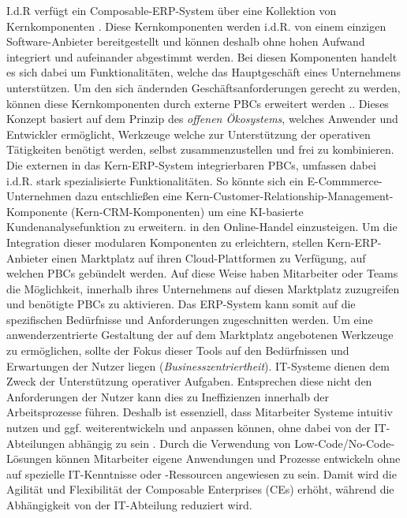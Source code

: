 I.d.R verfügt ein Composable-ERP-System über eine Kollektion von Kernkomponenten \cite[7]{Sensedia.2020}. Diese Kernkomponenten werden i.d.R. von einem einzigen Software-Anbieter bereitgestellt und können deshalb ohne hohen Aufwand integriert und aufeinander abgestimmt werden. Bei diesen Komponenten handelt es sich dabei um Funktionalitäten, welche das Hauptgeschäft eines Unternehmens unterstützen. Um den sich ändernden Geschäftsanforderungen gerecht zu werden, können diese Kernkomponenten durch externe PBCs erweitert werden \cite[58]{.2009}.. Dieses Konzept basiert auf dem Prinzip des \textit{offenen Ökosystems}, welches Anwender und Entwickler ermöglicht, Werkzeuge welche zur Unterstützung der operativen Tätigkeiten benötigt werden, selbst zusammenzustellen und frei zu kombinieren. Die externen in das Kern-ERP-System integrierbaren PBCs, umfassen dabei i.d.R. stark spezialisierte Funktionalitäten. So könnte sich ein E-Commmerce-Unternehmen dazu entschließen eine Kern-Customer-Relationship-Management-Komponente (Kern-\acs{CRM}-Komponenten) um eine KI-basierte Kundenanalysefunktion zu erweitern. in den Online-Handel einzusteigen. Um die Integration dieser modularen Komponenten zu erleichtern, stellen Kern-ERP-Anbieter einen Marktplatz auf ihren Cloud-Plattformen zu Verfügung, auf welchen PBCs gebündelt werden. Auf diese Weise haben Mitarbeiter oder Teams die Möglichkeit, innerhalb ihres Unternehmens auf diesen Marktplatz zuzugreifen und benötigte PBCs zu aktivieren. Das ERP-System kann somit auf die spezifischen Bedürfnisse und Anforderungen zugeschnitten werden. Um eine anwenderzentrierte Gestaltung der auf dem Marktplatz angebotenen Werkzeuge zu ermöglichen, sollte der Fokus dieser Tools auf den Bedürfnissen und Erwartungen der Nutzer liegen (\textit{Businesszentriertheit}). IT-Systeme dienen dem Zweck der Unterstützung operativer Aufgaben. Entsprechen diese nicht den Anforderungen der Nutzer kann dies zu Ineffizienzen innerhalb der Arbeitsprozesse führen. Deshalb ist essenziell, dass Mitarbeiter Systeme intuitiv nutzen und ggf. weiterentwickeln und anpassen können, ohne dabei von der IT-Abteilungen abhängig zu sein \cite{.20230313}. Durch die Verwendung von Low-Code/No-Code-Lösungen können Mitarbeiter eigene Anwendungen und Prozesse entwickeln ohne auf spezielle IT-Kenntnisse oder -Ressourcen angewiesen zu sein. Damit wird die Agilität und Flexibilität der Composable Enterprises (\acs{CE}s) erhöht, während die Abhängigkeit von der IT-Abteilung reduziert wird.

